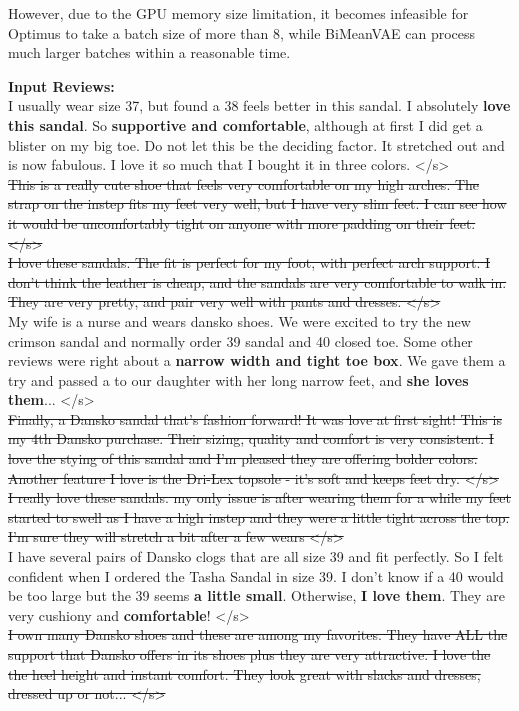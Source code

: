 \documentclass[11pt]{article}
\newcommand{\name}{\mbox{\sc BiMeanVAE}}
\newcommand{\gray}[1]{{\color[HTML]{808080} \sout{#1}}}
\newcommand\two[1]{\textcolor{c2}{\textbf{#1}}}
\newcommand\three[1]{\textcolor{c3}{\textbf{#1}}}
\newcommand\four[1]{\textcolor{c4}{\textbf{#1}}}
\begin{document}
However, due to the GPU memory size limitation, it becomes infeasible for Optimus to take a batch size of more than 8, while \name{} can process much larger batches within a reasonable time. 

        

        

\begin{figure*}[th]
    \small
    \vspace{1em}
    \begin{mdframed}
        \textbf{Input Reviews: }\\
        I usually wear size 37, but found a 38 feels better in this sandal. I absolutely \four{love this sandal}. So \two{supportive and comfortable}, although at first I did get a blister on my big toe. Do not let this be the deciding factor. It stretched out and is now fabulous. I love it so much that I bought it in three colors. </s> \\
        \gray{This is a really cute shoe that feels very comfortable on my high arches. The strap on the instep fits my feet very well, but I have very slim feet. I can see how it would be uncomfortably tight on anyone with more padding on their feet. </s>}\\
        \gray{I love these sandals. The fit is perfect for my foot, with perfect arch support. I don't think the leather is cheap, and the sandals are very comfortable to walk in. They are very pretty, and pair very well with pants and dresses. </s>}\\
        My wife is a nurse and wears dansko shoes. We were excited to try the new crimson sandal and normally order 39 sandal and 40 closed toe. Some other reviews were right about a  \three{narrow width and tight toe box}. We gave them a try and passed a  to our daughter with her long narrow feet, and \four{she loves them}... </s>\\
        \gray{Finally, a Dansko sandal that's fashion forward! It was love at first sight! This is my 4th Dansko purchase. Their sizing, quality and comfort is very consistent. I love the stying of this sandal and I'm pleased they are offering bolder colors. Another feature I love is the Dri-Lex topsole - it's soft and keeps feet dry. </s>} \\
        \gray{I really love these sandals. my only issue is after wearing them for a while my feet started to swell as I have a high instep and they were a little tight across the top. I'm sure they will stretch a bit after a few wears </s>}\\
        I have several pairs of Dansko clogs that are all size 39 and fit perfectly. So I felt confident when I ordered the Tasha Sandal in size 39. I don't know if a 40 would be too large but the 39 seems \three{a little small}. Otherwise, \four{I love them}. They are very cushiony and \two{comfortable}! </s>\\
        \gray{I own many Dansko shoes and these are among my favorites. They have ALL the support that Dansko offers in its shoes plus they are very attractive. I love the the heel height and instant comfort. They look great with slacks and dresses, dressed up or not... </s>}\\
        

\end{mdframed}
\end{figure*}
\end{document}
